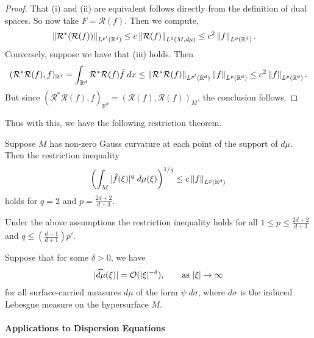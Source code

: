 \documentclass{article}
\begin{document}
\begin{proof}
	That (i) and (ii) are equivalent follows directly from the definition of dual spaces. So now take $F = \mathcal{R}(f)$. Then we compute, 
	\begin{align*}
		\begin{split}
			\left\Vert \mathcal{R}^{\ast}(\mathcal{R}(f)) \right\Vert_{L^{p'}(\mathbb{R}^{d})} &\leq c \left\Vert \mathcal{R}(f) \right\Vert_{L^{2}(M, d\mu)} \leq c^{2}\left\Vert f \right\Vert_{L^{p}(\mathbb{R}^{d})}. 
		\end{split} 
	\end{align*} 
	Conversely, suppose we have that (iii) holds. Then 
	\begin{equation*}
		(\mathcal{R}^{\ast}\mathcal{R}(f), f)_{\mathbb{R}^{d}} = \int_{\mathbb{R}^{d}}\mathcal{R}^{\ast}\mathcal{R}(f)\bar{f}\;dx \leq \left\Vert \mathcal{R}^{\ast}\mathcal{R}(f) \right\Vert_{L^{p'}(\mathbb{R}^{d})}\left\Vert f \right\Vert_{L^{p}(\mathbb{R}^{d})} \leq c^{2}\left\Vert f \right\Vert_{L^{p}(\mathbb{R}^{d})}. 
	\end{equation*} 
	But since $(\mathcal{R}^{\ast}\mathcal{R}(f), f)_{\mathbb{R}^{d}} = (\mathcal{R}(f), \mathcal{R}(f))_{M}$, the conclusion follows. 
\end{proof} 
Thus with this, we have the following restriction theorem. 
\begin{theorem}
	Suppose $M$ has non-zero Gauss curvature at each point of the support of $d\mu$. Then the restriction inequality
	\begin{equation*}
		\left(\int_{M}|\hat{f}(\xi)|^{q}\;d\mu(\xi)\right)^{1/q} \leq c\left\Vert f \right\Vert_{L^{p}(\mathbb{R}^{d})}
	\end{equation*} 
	holds for $q = 2$ and $p = \frac{2d + 2}{d + 3}$. 
\end{theorem} 
\begin{corollary}[Interpolation]
	Under the above assumptions the restriction inequality holds for all $1 \leq p \leq \frac{2d + 2}{d + 3}$ and $q \leq \left(\frac{d - 1}{d + 1}\right)p'$. 
\end{corollary} 
\begin{corollary}
	Suppose that for some $\delta > 0$, we have 
	\begin{equation*}
		|\widehat{d\mu}(\xi)| = \mathcal{O}(|\xi|^{-\delta}), \qquad \text{as $|\xi| \to \infty$}
	\end{equation*}
	for all surface-carried measures $d\mu$ of the form $\psi\;d\sigma$, where $d\sigma$ is the induced Lebesgue measure on the hypersurface $M$. 
\end{corollary} 
\paragraph{Applications to Dispersion Equations} 
\end{document}
